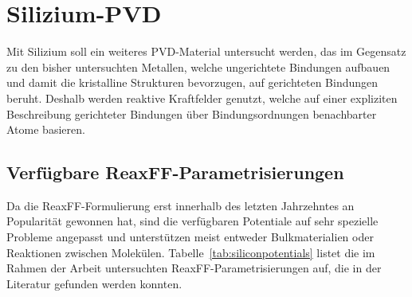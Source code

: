 \section{Silizium-PVD}
\label{siliconpvd}

Mit Silizium soll ein weiteres PVD-Material untersucht werden, das im Gegensatz zu den bisher untersuchten Metallen, welche ungerichtete Bindungen aufbauen und damit die kristalline Strukturen bevorzugen, auf gerichteten Bindungen beruht.
Deshalb werden reaktive Kraftfelder genutzt, welche auf einer expliziten Beschreibung gerichteter Bindungen über Bindungsordnungen benachbarter Atome basieren.

\subsection{Verfügbare ReaxFF-Parametrisierungen}

Da die ReaxFF-Formulierung erst innerhalb des letzten Jahrzehntes an Popularität gewonnen hat, sind die verfügbaren Potentiale auf sehr spezielle Probleme angepasst und unterstützen meist entweder Bulkmaterialien oder Reaktionen zwischen Molekülen.
Tabelle~\ref{tab:siliconpotentials} listet die im Rahmen der Arbeit untersuchten ReaxFF-Parametrisierungen auf, die in der Literatur gefunden werden konnten.

